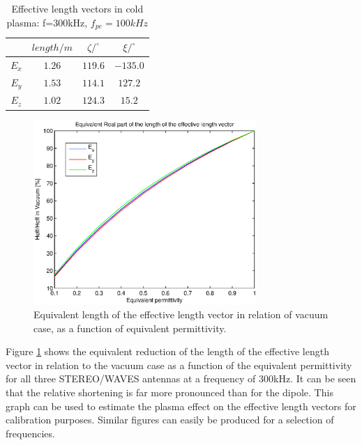 \documentclass[draft,ras]{agutex}
\begin{document}
\begin{article}
\begin{table}
\caption{Effective length vectors in cold plasma: f=300kHz, $f_{pe}=100kHz$}
\label{tab:heff_cold_plasma_stereo}
\begin{tabular}{|c|c|c|c|}
 \hline
 & $length/m$ & $\zeta/^\circ$ & $\xi/^\circ$ \\
\hline
$E_x$ & $1.26$ & $119.6$ & $-135.0$ \\
$E_y$ & $1.53$ & $114.1$ & $127.2$ \\
$E_z$ & $1.02$ & $124.3$ & $15.2$ \\
\hline\end{tabular}
\end{table}



\begin{figure}
  \noindent\includegraphics[width=20pc]{heff_shortening_stereo.eps}
\caption{Equivalent length of the effective length vector in relation of vacuum case, as a function of equivalent permittivity.}
\label{fig:relative_heff_shortening_stereo}
\end{figure}

Figure \ref{fig:relative_heff_shortening_stereo} shows the equivalent reduction of the length of the effective length vector in relation to the vacuum case as a function of the equivalent permittivity for all three STEREO/WAVES antennas at a frequency of 300kHz. It can be seen that the relative shortening is far more pronounced than for the dipole. This graph can be used to estimate the plasma effect on the effective length vectors for calibration purposes. Similar figures can easily be produced for a selection of frequencies.\\


\end{article}
\end{document}

